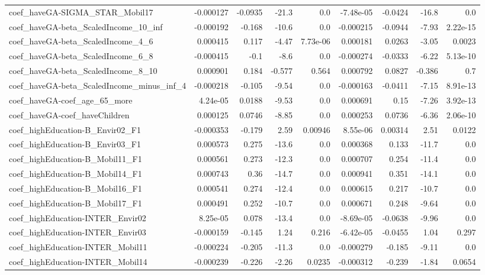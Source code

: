 \begin{tabular}{lrrrrrrrr}
coef_haveGA-SIGMA_STAR_Mobil17 & -0.000127 & -0.0935 & -21.3 & 0.0 & -7.48e-05 & -0.0424 & -16.8 & 0.0 \\
coef_haveGA-beta_ScaledIncome_10_inf & -0.000192 & -0.168 & -10.6 & 0.0 & -0.000215 & -0.0944 & -7.93 & 2.22e-15 \\
coef_haveGA-beta_ScaledIncome_4_6 & 0.000415 & 0.117 & -4.47 & 7.73e-06 & 0.000181 & 0.0263 & -3.05 & 0.0023 \\
coef_haveGA-beta_ScaledIncome_6_8 & -0.000415 & -0.1 & -8.6 & 0.0 & -0.000274 & -0.0333 & -6.22 & 5.13e-10 \\
coef_haveGA-beta_ScaledIncome_8_10 & 0.000901 & 0.184 & -0.577 & 0.564 & 0.000792 & 0.0827 & -0.386 & 0.7 \\
coef_haveGA-beta_ScaledIncome_minus_inf_4 & -0.000218 & -0.105 & -9.54 & 0.0 & -0.000163 & -0.0411 & -7.15 & 8.91e-13 \\
coef_haveGA-coef_age_65_more & 4.24e-05 & 0.0188 & -9.53 & 0.0 & 0.000691 & 0.15 & -7.26 & 3.92e-13 \\
coef_haveGA-coef_haveChildren & 0.000125 & 0.0746 & -8.85 & 0.0 & 0.000253 & 0.0736 & -6.36 & 2.06e-10 \\
coef_highEducation-B_Envir02_F1 & -0.000353 & -0.179 & 2.59 & 0.00946 & 8.55e-06 & 0.00314 & 2.51 & 0.0122 \\
coef_highEducation-B_Envir03_F1 & 0.000573 & 0.275 & -13.6 & 0.0 & 0.000368 & 0.133 & -11.7 & 0.0 \\
coef_highEducation-B_Mobil11_F1 & 0.000561 & 0.273 & -12.3 & 0.0 & 0.000707 & 0.254 & -11.4 & 0.0 \\
coef_highEducation-B_Mobil14_F1 & 0.000743 & 0.36 & -14.7 & 0.0 & 0.000941 & 0.351 & -14.1 & 0.0 \\
coef_highEducation-B_Mobil16_F1 & 0.000541 & 0.274 & -12.4 & 0.0 & 0.000615 & 0.217 & -10.7 & 0.0 \\
coef_highEducation-B_Mobil17_F1 & 0.000491 & 0.252 & -10.7 & 0.0 & 0.000671 & 0.248 & -9.64 & 0.0 \\
coef_highEducation-INTER_Envir02 & 8.25e-05 & 0.078 & -13.4 & 0.0 & -8.69e-05 & -0.0638 & -9.96 & 0.0 \\
coef_highEducation-INTER_Envir03 & -0.000159 & -0.145 & 1.24 & 0.216 & -6.42e-05 & -0.0455 & 1.04 & 0.297 \\
coef_highEducation-INTER_Mobil11 & -0.000224 & -0.205 & -11.3 & 0.0 & -0.000279 & -0.185 & -9.11 & 0.0 \\
coef_highEducation-INTER_Mobil14 & -0.000239 & -0.226 & -2.26 & 0.0235 & -0.000312 & -0.239 & -1.84 & 0.0654 \\

\end{tabular}
